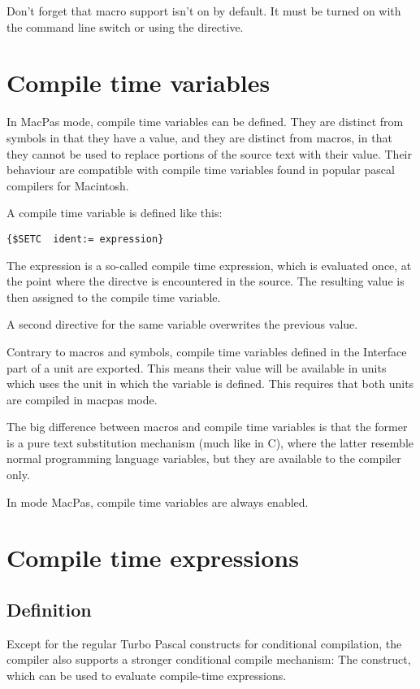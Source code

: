\begin{remark}Don't forget that macro support isn't on by default. It must
be turned on  with the  command line switch or using the
 directive.
\end{remark}


\section{Compile time variables}
In MacPas mode, compile time variables can be defined. They are distinct
from symbols in that they have a value, and they are distinct from macros,
in that they cannot be used to replace portions of the source text with
their value. Their behaviour are compatible with compile time variables 
found in popular pascal compilers for Macintosh. 

A compile time variable is defined like this:
\begin{verbatim}
{$SETC  ident:= expression}
\end{verbatim}
The expression is a so-called compile time expression, which is evaluated once, 
at the point where the  directve is encountered in the
source. The resulting value is then assigned to the compile time variable.

A second  directive for the same variable overwrites the previous value.

Contrary to macros and symbols, compile time variables defined in the 
Interface part of a unit are exported. This means their value will be 
available in units which uses the unit in which the variable is defined. 
This requires that both units are compiled in macpas mode.

The big difference between macros and compile time variables is that the
former is a pure text substitution mechanism (much like in C), where the
latter resemble normal programming language variables, but they are
available to the compiler only. 

In mode MacPas, compile time variables are always enabled.

\section{Compile time expressions}
\subsection{Definition}
\label{se:compileexpressions}
Except for the regular Turbo Pascal constructs for conditional compilation,
the \fpc compiler also supports a stronger conditional compile mechanism: 
The  construct, which can be used to evaluate compile-time
expressions.


